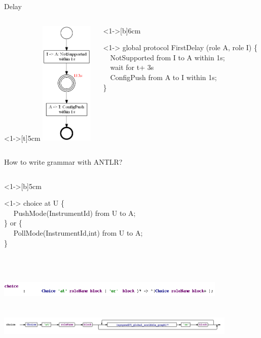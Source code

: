 \documentclass[8 pt]{beamer}
\newcommand{\BLUE}{\color[rgb]{0,0,0.69}}
\begin{document}
\begin{frame}{Delay}
\begin{columns}
\begin{column}<1->[t]{5cm}
\includegraphics[height=6cm]{Delay}
\end{column}
\begin{column}<1->[b]{6cm}
\begin{exampleblock}<1->{}
{\BLUE global protocol} FirstDelay (role A, role I) \{ \\
~~NotSupported {\BLUE from} I {\BLUE to} A {\BLUE within} 1s;\\
~~{\BLUE wait for} t+ 3s\\
 ~~ConfigPush {\BLUE from} A {\BLUE to} I {\BLUE within} 1s;\\
\}\\
\end{exampleblock}
~~\\
~~\\
~~\\
~~\\
\end{column}
\end{columns}
\end{frame}

\begin{frame}{How to write grammar with ANTLR?}
\begin{columns}
\begin{column}<1->[b]{5cm}
\begin{exampleblock}<1->{}
{\BLUE choice at} U \{ \\
~~	PushMode(InstrumentId) {\BLUE from} U {\BLUE to} A;\\
\} {\BLUE or} \{ \\
~~	PollMode(InstrumentId,int) {\BLUE from} U {\BLUE to} A;\\
\}
\end{exampleblock}
\end{column}
\end{columns}
~~\\
~~\\
\includegraphics[width=11cm]{choicerule2}
~~\\
~~\\
~~\\
\includegraphics[width = 11.5cm]{choicerule}
\end{frame}
\end{document}
